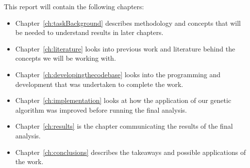 This report will contain the following chapters:
\begin{itemize}
    \item Chapter~\ref{ch:taskBackground} describes methodology and concepts that will be needed to understand results in later chapters.
    \item Chapter~\ref{ch:literature} looks into previous work and literature behind the concepts we will be working with.
    \item Chapter~\ref{ch:developingthecodebase} looks into the programming and development that was undertaken to complete the work.
    \item Chapter~\ref{ch:implementation} looks at how the application of our genetic algorithm was improved before running the final analysis.
    \item Chapter~\ref{ch:results} is the chapter communicating the results of the final analysis.
    \item Chapter~\ref{ch:conclusions} describes the takeaways and possible applications of the work.
\end{itemize}